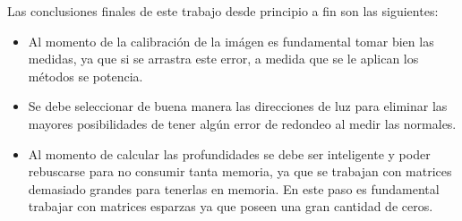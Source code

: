 

Las conclusiones finales de este trabajo desde principio a fin son las siguientes:
\begin{itemize}
\item Al momento de la calibración de la im\'agen es fundamental tomar bien las medidas, ya que si se arrastra este error, a medida que se le aplican los m\'etodos se potencia.
\item Se debe seleccionar de buena manera las direcciones de luz para eliminar las mayores posibilidades de tener alg\'un error de redondeo al medir las normales.
\item Al momento de calcular las profundidades se debe ser inteligente y poder rebuscarse para no consumir tanta memoria, ya que se trabajan con matrices demasiado grandes para tenerlas en memoria. En este paso es fundamental trabajar con matrices esparzas ya que poseen una gran cantidad de ceros.
\end{itemize}